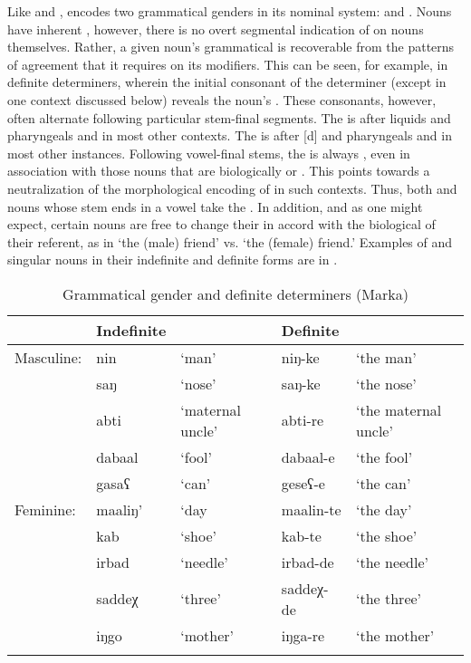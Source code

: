 \documentclass[output=paper,modfonts,nonflat,
colorlinks, citecolor=brown,
draftmode
]{langsci/langscibook}
\begin{document}
 Like  and ,  encodes two grammatical genders in its nominal system:  and . Nouns have inherent , however, there is no overt segmental indication of  on nouns themselves. Rather, a given noun's grammatical  is recoverable from the patterns of agreement that it requires on its modifiers. This can be seen, for example, in definite determiners, wherein the initial consonant of the determiner (except in one context discussed below) reveals the noun's . These consonants, however, often alternate following particular stem-final segments. The   is  after liquids and pharyngeals and  in most other contexts. The   is  after [d] and pharyngeals and  in most other instances. Following vowel-final stems, the  is always , even in association with those nouns that are biologically  or . This points towards a neutralization of the morphological encoding of  in such contexts. Thus, both  and  nouns whose stem ends in a vowel take the  . In addition, and as one might expect, certain nouns are free to change their  in accord with the biological  of their referent, as in  `the (male) friend' vs.  `the (female) friend.' Examples of   and  singular nouns in their indefinite and definite forms are in .
 


\begin{table}
 	\caption{{Grammatical gender and definite determiners (Marka)}}
 	\label{tab:1:Grammatical Gender}
 	\begin{tabularx}{\textwidth}{Xllll} 
 		\lsptoprule
 		 & Indefinite  &  & Definite &  \\ 
 		\midrule
 		Masculine: & nin & `man' & niŋ-ke & `the man' \\
 		 & saŋ  &   `nose' & saŋ-ke & `the nose' \\
 		 & abti & `maternal uncle' & abti-re & `the maternal uncle'  \\
 		 & dabaal & `fool' & dabaal-e & `the fool' \\
 		  & gasaʕ & `can' & geseʕ-e & `the can'\\
 		\tablevspace
 		Feminine: & maaliŋ' & `day & maalin-te & `the day' \\
 		 & kab & `shoe' & kab-te & `the shoe' \\
 		 & irbad & `needle' & irbad-de & `the needle' \\
 		  & saddeχ & `three' & saddeχ-de & `the three' \\
	 	& iŋgo & `mother' & iŋga-re & `the mother' \\
 		\lspbottomrule
 	\end{tabularx}
 \end{table}
 
\end{document}
